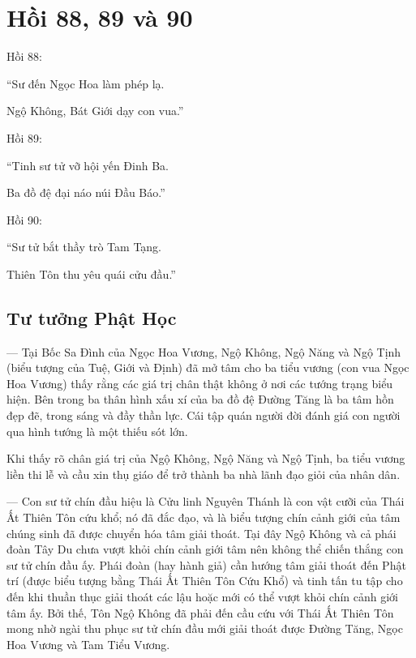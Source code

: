 \chapter{Hồi 88, 89 và 90} %
\label{cha:hoi_88_89_90}

Hồi 88:

\begin{itshape}
``Sư đến Ngọc Hoa làm phép lạ.

Ngộ Không, Bát Giới dạy con vua.''
\end{itshape}

Hồi 89:

\begin{itshape}
``Tinh sư tử vỡ hội yến Đinh Ba.

Ba đồ đệ đại náo núi Đầu Báo.''
\end{itshape}

Hồi 90:

\begin{itshape}
``Sư tử bắt thầy trò Tam Tạng.

Thiên Tôn thu yêu quái cửu đầu.''
\end{itshape}

\section{Tư tưởng Phật Học} %
\label{sec:88_89_90_phat_hoc}

— Tại Bốc Sa Đình của Ngọc Hoa Vương, Ngộ Không, Ngộ Năng và Ngộ Tịnh (biểu tượng của Tuệ, Giới và Định) đã mở tâm cho ba tiểu vương (con vua Ngọc Hoa Vương) thấy rằng các giá trị chân thật không ở nơi các tướng trạng biểu hiện. Bên trong ba thân hình xấu xí của ba đồ đệ Đường Tăng là ba tâm hồn đẹp đẽ, trong sáng và đầy thần lực. Cái tập quán người đời đánh giá con người qua hình tướng là một thiếu sót lớn.

Khi thấy rõ chân giá trị của Ngộ Không, Ngộ Năng và Ngộ Tịnh, ba tiểu vương liền thi lễ và cầu xin thụ giáo để trở thành ba nhà lãnh đạo giỏi của nhân dân.

— Con sư tử chín đầu hiệu là Cửu linh Nguyên Thánh là con vật cưỡi của Thái Ất Thiên Tôn cứu khổ; nó đã đắc đạo, và là biểu tượng chín cảnh giới của tâm chúng sinh đã được chuyển hóa tâm giải thoát. Tại đây Ngộ Không và cả phái đoàn Tây Du chưa vượt khỏi chín cảnh giới tâm nên không thể chiến thắng con sư tử chín đầu ấy. Phái đoàn (hay hành giả) cần hướng tâm giải thoát đến Phật trí (được biểu tượng bằng Thái Ất Thiên Tôn Cứu Khổ) và tinh tấn tu tập cho đến khi thuần thục giải thoát các lậu hoặc mới có thể vượt khỏi chín cảnh giới tâm ấy. Bởi thế, Tôn Ngộ Không đã phải đến cầu cứu với Thái Ất Thiên Tôn mong nhờ ngài thu phục sư tử chín đầu mới giải thoát được Đường Tăng, Ngọc Hoa Vương và Tam Tiểu Vương.

